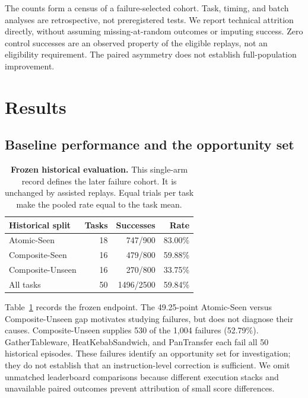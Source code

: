 \documentclass[10pt,twocolumn,letterpaper]{article}
\begin{document}
The counts form a census of a failure-selected cohort. Task, timing, and batch analyses are retrospective, not preregistered tests. We report technical attrition directly, without assuming missing-at-random outcomes or imputing success. Zero control successes are an observed property of the eligible replays, not an eligibility requirement. The paired asymmetry does not establish full-population improvement.

\section{Results}
\label{sec:results}
\subsection{Baseline performance and the opportunity set}
\begin{table}[t]
\centering\small
\begin{tabular}{@{}lrrr@{}}
\toprule
Historical split & Tasks & Successes & Rate\\
\midrule
Atomic-Seen &18&747/900&83.00\%\\
Composite-Seen &16&479/800&59.88\%\\
Composite-Unseen &16&270/800&33.75\%\\
\midrule
All tasks &50&1496/2500&59.84\%\\
\bottomrule
\end{tabular}
\caption{\textbf{Frozen historical evaluation.} This single-arm record defines the later failure cohort. It is unchanged by assisted replays. Equal trials per task make the pooled rate equal to the task mean.}
\label{tab:baseline}
\end{table}
Table~\ref{tab:baseline} records the frozen endpoint. The 49.25-point Atomic-Seen versus Composite-Unseen gap motivates studying failures, but does not diagnose their causes. Composite-Unseen supplies 530 of the 1,004 failures (52.79\%). GatherTableware, HeatKebabSandwich, and PanTransfer each fail all 50 historical episodes. These failures identify an opportunity set for investigation; they do not establish that an instruction-level correction is sufficient. We omit unmatched leaderboard comparisons because different execution stacks and unavailable paired outcomes prevent attribution of small score differences.
\end{document}
